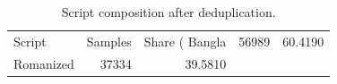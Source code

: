 \begin{table}
\caption{Script composition after deduplication.}
\label{tab:script_distribution}
\begin{tabular}{lrr}
\toprule
Script & Samples & Share (%
\midrule
Bangla & 56989 & 60.4190 \\
Romanized & 37334 & 39.5810 \\
\bottomrule
\end{tabular}
\end{table}
